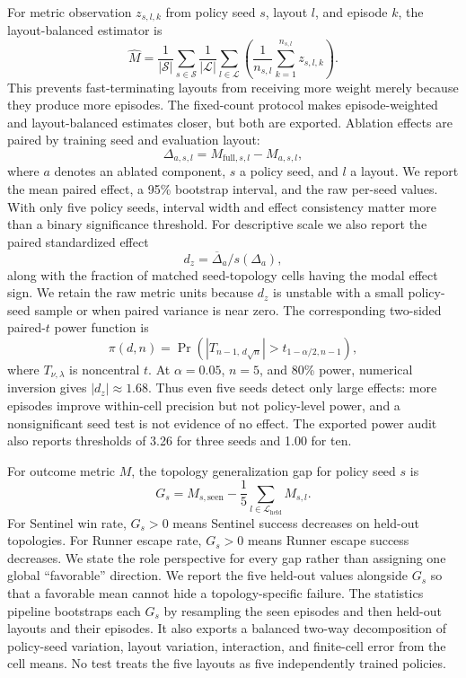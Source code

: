 \documentclass[journal]{IEEEtran}
\begin{document}
For metric observation $z_{s,l,k}$ from policy seed $s$, layout $l$, and episode $k$, the layout-balanced estimator is
\begin{equation}
\widehat{M}=\frac{1}{|\mathcal{S}|}\sum_{s\in\mathcal{S}}
\frac{1}{|\mathcal{L}|}\sum_{l\in\mathcal{L}}
\left(\frac{1}{n_{s,l}}\sum_{k=1}^{n_{s,l}}z_{s,l,k}\right).
\end{equation}
This prevents fast-terminating layouts from receiving more weight merely because they produce more episodes. The fixed-count protocol makes episode-weighted and layout-balanced estimates closer, but both are exported. Ablation effects are paired by training seed and evaluation layout:
\begin{equation}
\Delta_{a,s,l}=M_{\mathrm{full},s,l}-M_{a,s,l},
\end{equation}
where $a$ denotes an ablated component, $s$ a policy seed, and $l$ a layout. We report the mean paired effect, a 95\% bootstrap interval, and the raw per-seed values. With only five policy seeds, interval width and effect consistency matter more than a binary significance threshold.
For descriptive scale we also report the paired standardized effect
\begin{equation}
d_z=\overline{\Delta}_a/s(\Delta_a),
\end{equation}
along with the fraction of matched seed-topology cells having the modal effect sign. We retain the raw metric units because $d_z$ is unstable with a small policy-seed sample or when paired variance is near zero. The corresponding two-sided paired-$t$ power function is
\begin{equation}
\pi(d,n)=\Pr\!\left(\left|T_{n-1,\,d\sqrt{n}}\right|>
t_{1-\alpha/2,n-1}\right),
\end{equation}
where $T_{\nu,\lambda}$ is noncentral $t$. At $\alpha=0.05$, $n=5$, and 80\% power, numerical inversion gives $|d_z|\approx1.68$. Thus even five seeds detect only large effects: more episodes improve within-cell precision but not policy-level power, and a nonsignificant seed test is not evidence of no effect. The exported power audit also reports thresholds of 3.26 for three seeds and 1.00 for ten.

For outcome metric $M$, the topology generalization gap for policy seed $s$ is
\begin{equation}
G_s=M_{s,\mathrm{seen}}-\frac{1}{5}\sum_{l\in\mathcal{L}_{\mathrm{held}}}M_{s,l}.
\end{equation}
For Sentinel win rate, $G_s>0$ means Sentinel success decreases on held-out topologies. For Runner escape rate, $G_s>0$ means Runner escape success decreases. We state the role perspective for every gap rather than assigning one global ``favorable'' direction. We report the five held-out values alongside $G_s$ so that a favorable mean cannot hide a topology-specific failure. The statistics pipeline bootstraps each $G_s$ by resampling the seen episodes and then held-out layouts and their episodes. It also exports a balanced two-way decomposition of policy-seed variation, layout variation, interaction, and finite-cell error from the cell means. No test treats the five layouts as five independently trained policies.
\end{document}
